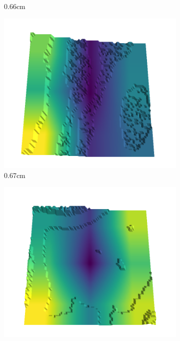 \begin{figure}[H]
\begin{subfigure}[b]{0.192\linewidth}
    \caption{0.66cm}
    \label{fig : quarry-best-16}
    \end{subfigure}
    \begin{subfigure}[b]{0.192\linewidth}
    \includegraphics[width=\linewidth]{../img/5/quarry/best/67-patch-3d-majavi-colormap-170.png}
    \caption{0.67cm}
    \label{fig : quarry-best-17}
    \end{subfigure}
    \begin{subfigure}[b]{0.192\linewidth}
    \includegraphics[width=\linewidth]{../img/5/quarry/best/68-patch-3d-majavi-colormap-180.png}

\end{subfigure}
\end{figure}
